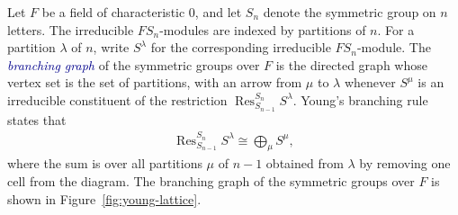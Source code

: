 \documentclass[11pt]{article}
\theoremstyle{definition}
\theoremstyle{remark}
\theoremstyle{definition}
\numberwithin{equation}{section}
\renewcommand\emph[1]{\textcolor{darkblue}{\it #1}}
\begin{document}
Let \(F\) be a field of characteristic \(0\), and let \(S_n\) denote the symmetric group on \(n\) letters. The irreducible \(F S_n\)-modules are indexed by partitions of \(n\). For a partition $\lambda$ of $n$, write \(S^\lambda\) for the corresponding irreducible \(F S_n\)-module. The \emph{branching graph} of the symmetric groups over \(F\) is the directed graph whose vertex set is the set of partitions, with an arrow from \(\mu\) to \(\lambda\) whenever \(S^\mu\) is an irreducible constituent of the restriction \(\operatorname{Res}^{S_n}_{S_{n-1}}S^\lambda\). Young's branching rule~\cite[Theorem~VII, p.~269]{You28} states that
\begin{align*}
\operatorname{Res}^{S_n}_{S_{n-1}} S^\lambda
\cong
\bigoplus_{\mu} S^\mu,
\end{align*}
where the sum is over all partitions $\mu$ of $n-1$ obtained from \(\lambda\) by removing one cell from the diagram. The branching graph of the symmetric groups over $F$ is shown in Figure~\ref{fig:young-lattice}.
\end{document}
